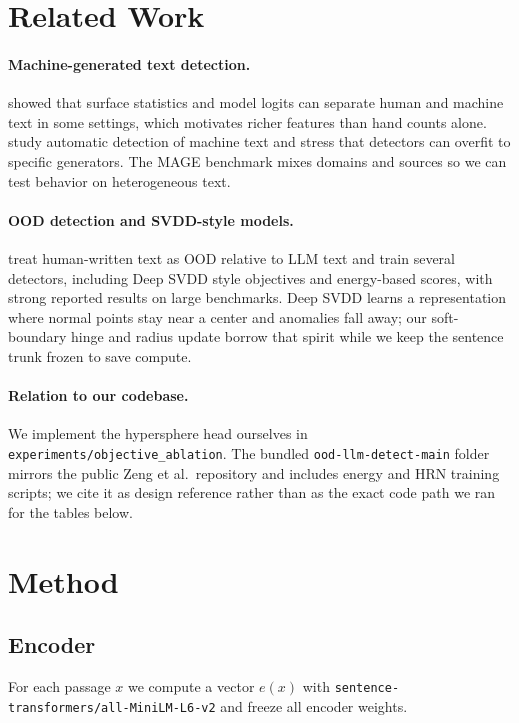 \documentclass[11pt]{article}
\begin{document}
\section{Related Work}
\paragraph{Machine-generated text detection.}
\citet{gehrmann2019gltr} showed that surface statistics and model logits can separate human and machine text in some settings, which motivates richer features than hand counts alone.
\citet{ippolito2019automatic} study automatic detection of machine text and stress that detectors can overfit to specific generators.
The MAGE benchmark \citep{wang2023mage} mixes domains and sources so we can test behavior on heterogeneous text.

\paragraph{OOD detection and SVDD-style models.}
\citet{zeng2025human} treat human-written text as OOD relative to LLM text and train several detectors, including Deep SVDD style objectives and energy-based scores, with strong reported results on large benchmarks.
Deep SVDD \citep{ruff2018deep} learns a representation where normal points stay near a center and anomalies fall away; our soft-boundary hinge and radius update borrow that spirit while we keep the sentence trunk frozen to save compute.

\paragraph{Relation to our codebase.}
We implement the hypersphere head ourselves in \texttt{experiments/objective\_ablation}.
The bundled \texttt{ood-llm-detect-main} folder mirrors the public Zeng et al.\ repository and includes energy and HRN training scripts; we cite it as design reference rather than as the exact code path we ran for the tables below.

\section{Method}
\subsection{Encoder}
For each passage $x$ we compute a vector $e(x)$ with \texttt{sentence-transformers/all-MiniLM-L6-v2} and freeze all encoder weights.
\end{document}
